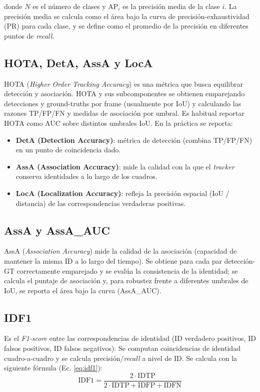 donde $N$ es el número de clases y $\text{AP}_i$ es la precisión media de la clase $i$. La precisión media se calcula como el área bajo la curva de precisión-exhaustividad (PR) para cada clase, y se define como el promedio de la precisión en diferentes puntos de \textit{recall}. 

\subsection{HOTA, DetA, AssA y LocA}
HOTA (\textit{Higher Order Tracking Accuracy}) es una métrica que busca equilibrar detección y asociación. HOTA y sus subcomponentes se obtienen emparejando detecciones y ground-truths por frame (usualmente por IoU) y calculando las razones TP/FP/FN y medidas de asociación por umbral. Es habitual reportar HOTA como AUC sobre distintos umbrales IoU. En la práctica se reporta:
\begin{itemize}
  \item \textbf{DetA (Detection Accuracy)}: métrica de detección (combina TP/FP/FN) en un punto de coincidencia dado.
  \item \textbf{AssA (Association Accuracy)}: mide la calidad con la que el \textit{tracker} conserva identidades a lo largo de los cuadros.
  \item \textbf{LocA (Localization Accuracy)}: refleja la precisión espacial (IoU / distancia) de las correspondencias verdaderas positivas.
\end{itemize}

\subsection{AssA y AssA\_AUC}
AssA (\textit{Association Accuracy}) mide la calidad de la asociación (capacidad de mantener la misma ID a lo largo del tiempo). Se obtiene para cada par detección-GT correctamente emparejado y se evalúa la consistencia de la identidad; se calcula el puntaje de asociación y, para robustez frente a diferentes umbrales de IoU, se reporta el área bajo la curva (AssA\_AUC).  

\subsection{IDF1}
Es el \textit{F1-score} entre las correspondencias de identidad (ID verdadero positivos, ID falsos positivos, ID falsos negativos). Se computan coincidencias de identidad cuadro-a-cuadro y se calcula precisión/\textit{recall} a nivel de ID. Se calcula con la siguiente fórmula (Ec. \ref{eq:idf1}):
\begin{equation}
\text{IDF1} = \frac{2 \cdot \text{IDTP}}{2\cdot\text{IDTP} + \text{IDFP} + \text{IDFN}}
\label{eq:idf1}
\end{equation}

